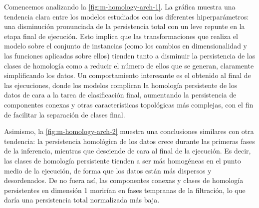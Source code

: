 Comencemos analizando la \autoref{fig:m-homology-arch-1}. La gráfica muestra una tendencia clara entre los modelos estudiados con los diferentes hiperparámetros: una disminución pronunciada de la persistencia total con un leve repunte en la etapa final de ejecución. Esto implica que las transformaciones que realiza el modelo sobre el conjunto de instancias (como los cambios en dimensionalidad y las funciones aplicadas sobre ellos) tienden tanto a disminuir la persistencia de las clases de homología como a reducir el número de ellos que se generan, claramente simplificando los datos. Un comportamiento interesante es el obtenido al final de las ejecuciones, donde los modelos complican la homología persistente de los datos de cara a la tarea de clasificación final, aumentando la persistencia de componentes conexas y otras características topológicas más complejas, con el fin de facilitar la separación de clases final.

Asimismo, la \autoref{fig:m-homology-arch-2} muestra una conclusiones similares con otra tendencia: la persistencia homológica de los datos crece durante las primeras fases de la inferencia, mientras que desciende de cara al final de la ejecución. Es decir, las clases de homología persistente tienden a ser más homogéneas en el punto medio de la ejecución, de forma que los datos están más dispersos y desordenados. De no fuera así, las componentes conexas y clases de homología persistentes en dimensión 1 morirían en fases tempranas de la filtración, lo que daría una persistencia total normalizada más baja.

